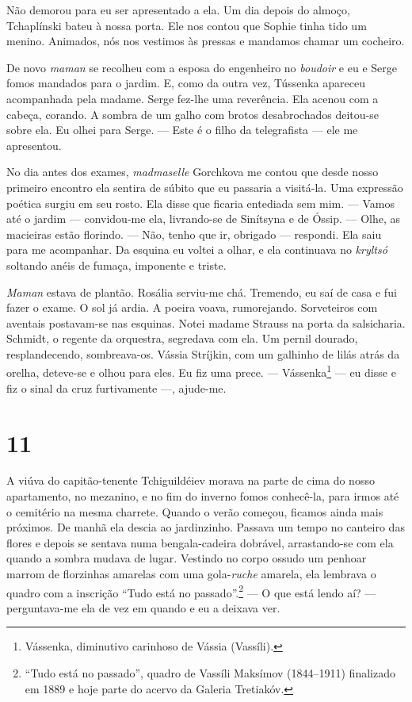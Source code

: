 Não demorou para eu ser apresentado a ela. Um dia depois do almoço,
Tchaplínski bateu à nossa porta. Ele nos contou que Sophie tinha tido um
menino. Animados, nós nos vestimos às pressas e mandamos chamar um
cocheiro.

De novo \emph{maman} se recolheu com a esposa do engenheiro no
\emph{boudoir} e eu e Serge fomos mandados para o jardim. E, como da
outra vez, Tússenka apareceu acompanhada pela madame. Serge fez-lhe uma
reverência. Ela acenou com a cabeça, corando. A sombra de um galho com
brotos desabrochados deitou-se sobre ela. Eu olhei para Serge. --- Este
é o filho da telegrafista --- ele me apresentou.

No dia antes dos exames, \emph{madmaselle} Gorchkova me contou que desde
nosso primeiro encontro ela sentira de súbito que eu passaria a
visitá-la. Uma expressão poética surgiu em seu rosto. Ela disse que
ficaria entediada sem mim. --- Vamos até o jardim --- convidou-me ela,
livrando-se de Sinítsyna e de Óssip. --- Olhe, as macieiras estão
florindo. --- Não, tenho que ir, obrigado --- respondi. Ela saiu para me
acompanhar. Da esquina eu voltei a olhar, e ela continuava no
\emph{kryltsó} soltando anéis de fumaça, imponente e triste.

\emph{Maman} estava de plantão. Rosália serviu-me chá. Tremendo, eu saí
de casa e fui fazer o exame. O sol já ardia. A poeira voava,
rumorejando. Sorveteiros com aventais postavam-se nas esquinas. Notei
madame Strauss na porta da salsicharia. Schmidt, o regente da orquestra,
segredava com ela. Um pernil dourado, resplandecendo, sombreava-os.
Vássia Stríjkin, com um galhinho de lilás atrás da orelha, deteve-se e
olhou para eles. Eu fiz uma prece. --- Vássenka\footnote{Vássenka,
  diminutivo carinhoso de Vássia (Vassíli).} --- eu disse e fiz o sinal
da cruz furtivamente ---, ajude-me.

\section{11}

A viúva do capitão-tenente Tchiguildéiev morava na parte de cima do
nosso apartamento, no mezanino, e no fim do inverno fomos conhecê-la,
para irmos até o cemitério na mesma charrete. Quando o verão começou,
ficamos ainda mais próximos. De manhã ela descia ao jardinzinho. Passava
um tempo no canteiro das flores e depois se sentava numa bengala-cadeira
dobrável, arrastando-se com ela quando a sombra mudava de lugar.
Vestindo no corpo ossudo um penhoar marrom de florzinhas amarelas com
uma gola-\emph{ruche} amarela, ela lembrava o quadro com a inscrição
``Tudo está no passado''.\footnote{``Tudo está no passado'', quadro de
  Vassíli Maksímov (1844--1911) finalizado em 1889 e hoje parte do
  acervo da Galeria Tretiakóv.} --- O que está lendo aí? ---
perguntava-me ela de vez em quando e eu a deixava ver.

